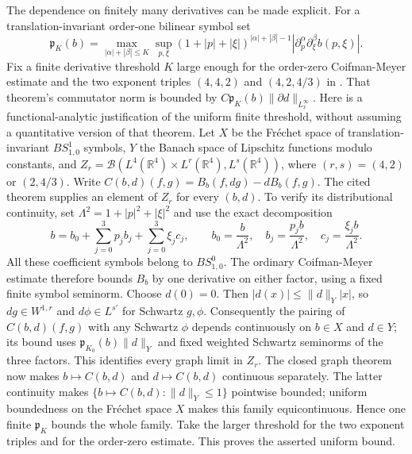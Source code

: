 \documentclass[11pt,a4paper]{article}
\numberwithin{equation}{section}
\newcommand{\R}{\mathbb R}
\newcommand{\f}[2]{\frac{#1}{#2}}
\theoremstyle{definition}
\begin{document}
The dependence on finitely many derivatives can be made explicit.
For a translation-invariant order-one bilinear symbol set
\begin{equation*}
 \mathfrak p_K(b)=
 \max_{|\alpha|+|\beta|\leq K}
 \sup_{p,\xi}(1+|p|+|\xi|)^{|\alpha|+|\beta|-1}
 |\partial_p^\alpha\partial_\xi^\beta b(p,\xi)|.
\end{equation*}
Fix a finite derivative threshold $K$ large enough for the
order-zero Coifman-Meyer estimate and the two exponent triples
$(4,4,2)$ and $(4,2,4/3)$ in \cite[Theorem~1]{BenyiOh}.
That theorem's commutator norm is bounded by
$C\mathfrak p_K(b)\|\partial d\|_{L^{\infty}_x}$.
Here is a functional-analytic justification of the uniform finite
threshold, without assuming a quantitative version of that theorem.
Let $X$ be the Fr\'echet space of translation-invariant $BS^1_{1,0}$
symbols, $Y$ the Banach space of Lipschitz functions modulo constants,
and $Z_r=\mathcal B(L^4(\R^4)\times L^r(\R^4),L^s(\R^4))$, where
$(r,s)=(4,2)$ or $(2,4/3)$. Write
$C(b,d)(f,g)=B_b(f,dg)-dB_b(f,g)$.
The cited theorem supplies an element of $Z_r$ for every $(b,d)$.
To verify its distributional continuity, set
$\Lambda^2=1+|p|^2+|\xi|^2$ and use the exact decomposition
\begin{equation*}
b=b_0+\sum_{j=0}^3p_jb_j+\sum_{j=0}^3\xi_jc_j,
\qquad
b_0=\f b{\Lambda^2},\quad
b_j=\f{p_jb}{\Lambda^2},\quad
c_j=\f{\xi_jb}{\Lambda^2}.
\end{equation*}
All these coefficient symbols belong to $BS^0_{1,0}$. The ordinary
Coifman-Meyer estimate therefore bounds $B_b$ by one derivative on
either factor, using a fixed finite symbol seminorm. Choose $d(0)=0$.
Then $|d(x)|\leq\|d\|_Y|x|$, so $dg\in W^{1,r}$ and
$d\phi\in L^{s'}$ for Schwartz $g,\phi$.
Consequently the pairing of $C(b,d)(f,g)$ with any Schwartz $\phi$
depends continuously on $b\in X$ and $d\in Y$; its bound uses
$\mathfrak p_{K_0}(b)\|d\|_Y$ and fixed weighted Schwartz seminorms
of the three factors. This identifies every graph limit in $Z_r$.
The closed graph theorem now makes $b\mapsto C(b,d)$ and
$d\mapsto C(b,d)$ continuous separately. The latter continuity
makes $\{b\mapsto C(b,d):\|d\|_Y\leq1\}$ pointwise bounded;
uniform boundedness on the Fr\'echet space $X$ makes this family
equicontinuous. Hence one finite $\mathfrak p_K$ bounds the whole
family. Take the larger threshold for the two exponent triples and
for the order-zero estimate. This proves the asserted uniform bound.
\end{document}
